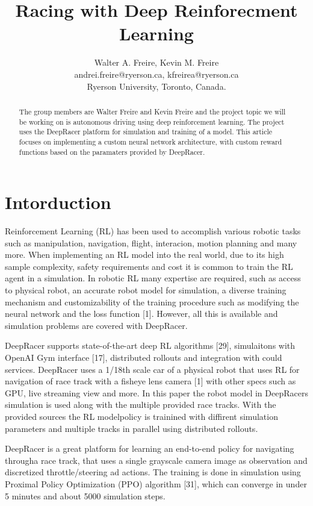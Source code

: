 \documentclass[journal]{IEEEtran}
\begin{document}
\title{Racing with Deep Reinforecment Learning}
\author{Walter A. Freire, Kevin M. Freire\\
andrei.freire@ryerson.ca, kfreirea@ryerson.ca\\
Ryerson University, Toronto, Canada.}
\maketitle
\begin{abstract}
The group members are Walter Freire and Kevin Freire and the project topic we will be working on is autonomous driving using deep reinforcement learning.  The project uses the DeepRacer platform for simulation and training of a model.  This article focuses on implementing a custom neural network architecture, with custom reward functions based on the paramaters provided by DeepRacer.  
\end{abstract}

\section{Intorduction}
Reinforcement Learning (RL) has been used to accomplish various robotic tasks such as manipulation,  navigation, flight, interacion, motion planning and many more.  When implementing an RL model into the real world, due to its high sample complexity, safety requirements and cost it is common to train the RL agent in a simulation.  In robotic RL many expertise are required, such as access to physical robot, an accurate robot model for simulation, a diverse training mechanism and customizability of the training procedure such as modifying the neural network and the loss function [1].  However, all this is available and simulation problems are covered with DeepRacer.  

DeepRacer supports state-of-the-art deep RL algorithms [29], simulaitons with OpenAI Gym interface [17], distributed rollouts and integration with could services.  DeepRacer uses a 1/18th scale car of a physical robot that uses RL for navigation of race track with a fisheye lens camera [1] with other specs such as GPU, live streaming view and more.  In this paper the robot model in DeepRacers simulation is used along with the multiple provided race tracks.  With the provided sources the RL modelpolicy is trainined with diffirent simulation parameters and multiple tracks in parallel using distributed rollouts.

DeepRacer is a great platform for learning an end-to-end policy for navigating througha race track, that uses a single grayscale camera image as observation and discretized throttle/steering ad actions.  The training is done in simulation using Proximal Policy Optimization (PPO) algorithm [31], which can converge in under 5 minutes and about 5000 simulation steps. 
\end{document}
